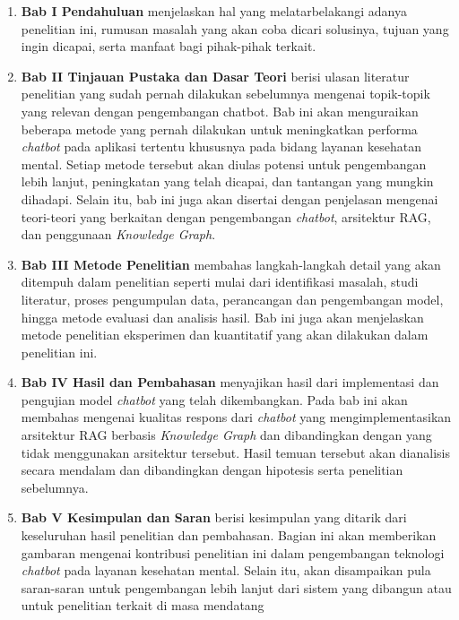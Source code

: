 \begin{enumerate}
	\item \textbf{Bab I Pendahuluan} menjelaskan hal yang melatarbelakangi adanya penelitian ini, rumusan masalah yang akan coba dicari solusinya, tujuan yang ingin dicapai, serta manfaat bagi pihak-pihak terkait.
	\item \textbf{Bab II Tinjauan Pustaka dan Dasar Teori} berisi ulasan literatur penelitian yang sudah pernah dilakukan sebelumnya mengenai topik-topik yang relevan dengan pengembangan chatbot.
	      Bab ini akan menguraikan beberapa metode yang pernah dilakukan untuk meningkatkan performa \textit{chatbot} pada aplikasi tertentu khususnya pada bidang layanan kesehatan mental.
	      Setiap metode tersebut akan diulas potensi untuk pengembangan lebih lanjut, peningkatan yang telah dicapai, dan tantangan yang mungkin dihadapi.
	      Selain itu, bab ini juga akan disertai dengan penjelasan mengenai teori-teori yang berkaitan dengan pengembangan \textit{chatbot}, arsitektur RAG, dan penggunaan \textit{Knowledge Graph}.
	\item \textbf{Bab III Metode Penelitian} membahas langkah-langkah detail yang akan ditempuh dalam penelitian seperti mulai dari identifikasi masalah, studi literatur, proses pengumpulan data, perancangan dan pengembangan model, hingga metode evaluasi dan analisis hasil.
	      Bab ini juga akan menjelaskan metode penelitian eksperimen dan kuantitatif yang akan dilakukan dalam penelitian ini.
	\item \textbf{Bab IV Hasil dan Pembahasan} menyajikan hasil dari implementasi dan pengujian model \textit{chatbot} yang telah dikembangkan.
	      Pada bab ini akan membahas mengenai kualitas respons dari \textit{chatbot} yang mengimplementasikan arsitektur RAG berbasis \textit{Knowledge Graph} dan dibandingkan dengan yang tidak menggunakan arsitektur tersebut.
	      Hasil temuan tersebut akan dianalisis secara mendalam dan dibandingkan dengan hipotesis serta penelitian sebelumnya.
	      \vspace{5cm}
	\item \textbf{Bab V Kesimpulan dan Saran}  berisi kesimpulan yang ditarik dari keseluruhan hasil penelitian dan pembahasan.
	      Bagian ini akan memberikan gambaran mengenai kontribusi penelitian ini dalam pengembangan teknologi \textit{chatbot} pada layanan kesehatan mental.
	      Selain itu, akan disampaikan pula saran-saran untuk pengembangan lebih lanjut dari sistem yang dibangun atau untuk penelitian terkait di masa mendatang
\end{enumerate}